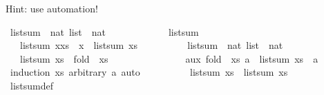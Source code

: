 \begin{isabellebody}
\begin{isamarkuptext}
  Hint: use automation!%
\end{isamarkuptext}\isamarkuptrue%
\isamarkupfalse%
\ list{\isacharunderscore}{\kern0pt}sum\ {\isacharcolon}{\kern0pt}{\isacharcolon}{\kern0pt}\ {\isachardoublequoteopen}nat\ list\ {\isasymRightarrow}\ nat{\isachardoublequoteclose}\ \isanewline
\ \ \ \ \isanewline
\ \ \isanewline
\ \ \ \ {\isachardoublequoteopen}list{\isacharunderscore}{\kern0pt}sum\ {\isacharbrackleft}{\kern0pt}{\isacharbrackright}{\kern0pt}\ {\isacharequal}{\kern0pt}\ {}{\isachardoublequoteclose}\isanewline
\ \ {\isacharbar}{\kern0pt}\ {\isachardoublequoteopen}list{\isacharunderscore}{\kern0pt}sum\ {\isacharparenleft}{\kern0pt}x{\isacharhash}{\kern0pt}xs{\isacharparenright}{\kern0pt}\ {\isacharequal}{\kern0pt}\ x\ {\isacharplus}{\kern0pt}\ list{\isacharunderscore}{\kern0pt}sum\ xs{\isachardoublequoteclose}\ \ \isanewline
\ \ \ \ \ \ \isanewline
\isanewline
{}\isamarkupfalse%
\ list{\isacharunderscore}{\kern0pt}sum{\isacharprime}{\kern0pt}\ {\isacharcolon}{\kern0pt}{\isacharcolon}{\kern0pt}\ {\isachardoublequoteopen}nat\ list\ {\isasymRightarrow}\ nat{\isachardoublequoteclose}\isanewline
\ \ \ \ \isanewline
\ \ \ {\isachardoublequoteopen}list{\isacharunderscore}{\kern0pt}sum{\isacharprime}{\kern0pt}\ xs\ {\isasymequiv}\ fold\ {\isacharparenleft}{\kern0pt}{\isacharplus}{\kern0pt}{\isacharparenright}{\kern0pt}\ xs\ {}{\isachardoublequoteclose}\isanewline
\ \ \ \ \ \ \ \ \isanewline
\isanewline
\ \ \ \ \isanewline
{}\isamarkupfalse%
\ aux{\isacharcolon}{\kern0pt}\ {\isachardoublequoteopen}fold\ {\isacharparenleft}{\kern0pt}{\isacharplus}{\kern0pt}{\isacharparenright}{\kern0pt}\ xs\ a\ {\isacharequal}{\kern0pt}\ list{\isacharunderscore}{\kern0pt}sum\ xs\ {\isacharplus}{\kern0pt}\ a{\isachardoublequoteclose}\ \ \isanewline
%
\isadelimproof
\ \ %
\endisadelimproof
%
\isatagproof
{}\isamarkupfalse%
\ {\isacharparenleft}{\kern0pt}induction\ xs\ arbitrary{\isacharcolon}{\kern0pt}\ a{\isacharparenright}{\kern0pt}\ auto%
\endisatagproof
{\isafoldproof}%
%
\isadelimproof
\isanewline
%
\endisadelimproof
\ \ \ \ \ \ \ \ \isanewline
\isanewline
{}\isamarkupfalse%
\ {\isachardoublequoteopen}list{\isacharunderscore}{\kern0pt}sum\ xs\ {\isacharequal}{\kern0pt}\ list{\isacharunderscore}{\kern0pt}sum{\isacharprime}{\kern0pt}\ xs{\isachardoublequoteclose}\isanewline
%
\isadelimproof
\ \ \ \ \ \ \isanewline
\ \ %
\endisadelimproof
%
\isatagproof
{}\isamarkupfalse%
\ list{\isacharunderscore}{\kern0pt}sum{\isacharprime}{\kern0pt}{\isacharunderscore}{\kern0pt}def\ \isamarkupfalse%

\end{isabellebody}
